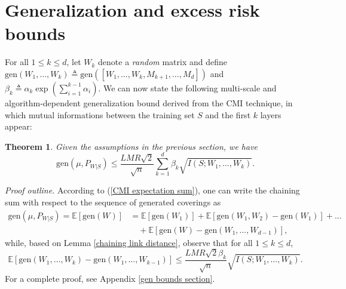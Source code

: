 \documentclass{article}
\newtheorem{theorem}{Theorem}
\newcommand{\E}{\mathbb{E}}
\newcommand{\gen}{\mathrm{gen}}
\begin{document}
\section{Generalization and excess risk bounds}\label{Gen bounds section main}
	For all $1\leq k \leq d$, let $W_k$ denote a \emph{random} matrix and define 
$
		\gen(W_1,\dots,W_k)\triangleq \gen(\left[W_1,\dots,W_k,M_{k+1},\dots,M_d\right])
	$
	and $\beta_k\triangleq \alpha_k\exp\left(\sum_{i=1}^{k-1} \alpha_i\right).$
We can now state the following multi-scale and algorithm-dependent generalization bound derived from the CMI technique, in which mutual informations between the training set $S$ and the first $k$ layers appear:
\begin{theorem}\label{CMI generalization deep nets theorem}
	Given the assumptions in the previous section, we have 
	\begin{equation}\label{CMI bound neural nets}
		\mathrm{gen}(\mu, P_{W|S})\leq \frac{LMR\sqrt{2}}{\sqrt{n}}\sum_{k=1}^{d}\beta_k\sqrt{I(S;W_1,\dots,W_k)}.
	\end{equation}
\end{theorem}  
{\it Proof outline.} According to (\ref{CMI expectation sum}), one can write the chaining sum with respect to the sequence of generated coverings as
\begin{align}
		\gen(\mu, P_{W|S})= \E[\gen(W)]&=\E[\gen(W_1)]+\E[\gen(W_1,W_2)-\gen(W_1)]+\dots \nonumber\\
		&\quad +\E[\gen(W)-\gen(W_1,\dots,W_{d-1})],\nonumber
	\end{align}
	while, based on Lemma \ref{chaining link distance}, observe that for all $1\leq k\leq d$, 	
	\begin{equation}
		\E[\gen(W_1,\dots,W_k)-\gen(W_1,\dots,W_{k-1})]\leq \frac{LMR\sqrt{2}\beta_k}{\sqrt{n}} \sqrt{I(S;W_1,\dots,W_k)}.\nonumber
	\end{equation}
For a complete proof, see Appendix \ref{gen bounds section}.
\end{document}
